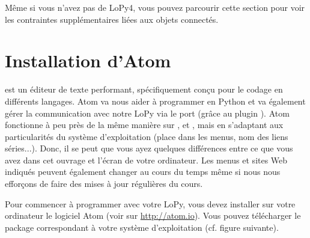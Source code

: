      \vspace{1em}


Même si vous n’avez pas de LoPy4, vous pouvez parcourir cette section pour voir les contraintes supplémentaires liées aux objets connectés.

\section{Installation d'Atom}

 est un éditeur de texte performant, spécifiquement conçu pour le codage en différents langages. 
Atom va nous aider à programmer en Python et va également gérer la communication avec notre LoPy via le port  (grâce au plugin ). Atom fonctionne à peu près de la même manière sur ,  et , mais en s’adaptant aux particularités du système d’exploitation (place dans les menus, nom des liens séries...). Donc, il se peut que vous ayez quelques différences entre ce que vous avez dans cet ouvrage et l’écran de votre ordinateur. Les menus et sites Web indiqués peuvent également changer au cours du temps même si nous nous efforçons de faire des mises à jour régulières du cours.


     \vspace{1em}

Pour commencer à programmer avec votre LoPy, vous devez installer sur votre ordinateur le logiciel Atom (voir sur \url{http://atom.io}). Vous pouvez télécharger le package correspondant à votre système d'exploitation (cf. figure suivante).

